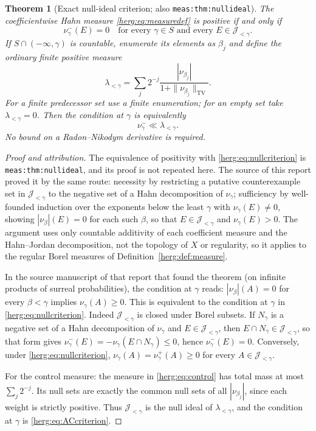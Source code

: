 \documentclass[11pt,letterpaper]{article}
\newtheorem{theorem}{Theorem}[section]
\theoremstyle{definition}
\newcommand{\TV}{\mathrm{TV}}
\newcommand{\lbl}[1]{\nolinkurl{#1}}%
\numberwithin{equation}{section}
\begin{document}
\begin{theorem}[Exact null-ideal criterion; also \lbl{meas:thm:nullideal}]\label{herg:thm:nullideal}
The coefficientwise Hahn measure \eqref{herg:eq:measuredef} is positive if and only if
\begin{equation}\label{herg:eq:nullcriterion}
 \nu_\gamma^-(E)=0
 \quad\text{for every }\gamma\in S
 \text{ and every }E\in\mathcal J_{<\gamma}.
\end{equation}
If $S\cap(-\infty,\gamma)$ is countable, enumerate its elements as $\beta_j$ and define the ordinary finite positive measure
\begin{equation}\label{herg:eq:control}
 \lambda_{<\gamma}
 =\sum_j 2^{-j}\frac{|\nu_{\beta_j}|}
 {1+\|\nu_{\beta_j}\|_{\TV}}.
\end{equation}
For a finite predecessor set use a finite enumeration; for an empty set take $\lambda_{<\gamma}=0$. Then the condition at $\gamma$ is equivalently
\begin{equation}\label{herg:eq:ACcriterion}
 \nu_\gamma^-\ll\lambda_{<\gamma}.
\end{equation}
No bound on a Radon--Nikodym derivative is required.
\end{theorem}
\begin{proof}[Proof and attribution]
The equivalence of positivity with \eqref{herg:eq:nullcriterion} is \lbl{meas:thm:nullideal}, and its proof is not repeated here. The source of this report proved it by the same route: necessity by restricting a putative counterexample set in $\mathcal J_{<\gamma}$ to the negative set of a Hahn decomposition of $\nu_\gamma$; sufficiency by well-founded induction over the exponents below the least $\gamma$ with $\nu_\gamma(E)\ne0$, showing $|\nu_\beta|(E)=0$ for each such $\beta$, so that $E\in\mathcal J_{<\gamma}$ and $\nu_\gamma(E)>0$. The argument uses only countable additivity of each coefficient measure and the Hahn--Jordan decomposition, not the topology of $X$ or regularity, so it applies to the regular Borel measures of Definition~\ref{herg:def:measure}.

In the source manuscript of that report that found the theorem (on infinite products of surreal probabilities), the condition at $\gamma$ reads: $|\nu_\beta|(A)=0$ for every $\beta<\gamma$ implies $\nu_\gamma(A)\ge0$. This is equivalent to the condition at $\gamma$ in \eqref{herg:eq:nullcriterion}. Indeed $\mathcal J_{<\gamma}$ is closed under Borel subsets. If $N_\gamma$ is a negative set of a Hahn decomposition of $\nu_\gamma$ and $E\in\mathcal J_{<\gamma}$, then $E\cap N_\gamma\in\mathcal J_{<\gamma}$, so that form gives $\nu_\gamma^-(E)=-\nu_\gamma(E\cap N_\gamma)\le0$, hence $\nu_\gamma^-(E)=0$. Conversely, under \eqref{herg:eq:nullcriterion}, $\nu_\gamma(A)=\nu_\gamma^+(A)\ge0$ for every $A\in\mathcal J_{<\gamma}$.

For the control measure: the measure in \eqref{herg:eq:control} has total mass at most $\sum_j2^{-j}$. Its null sets are exactly the common null sets of all $|\nu_{\beta_j}|$, since each weight is strictly positive. Thus $\mathcal J_{<\gamma}$ is the null ideal of $\lambda_{<\gamma}$, and the condition at $\gamma$ is \eqref{herg:eq:ACcriterion}.
\end{proof}
\end{document}

